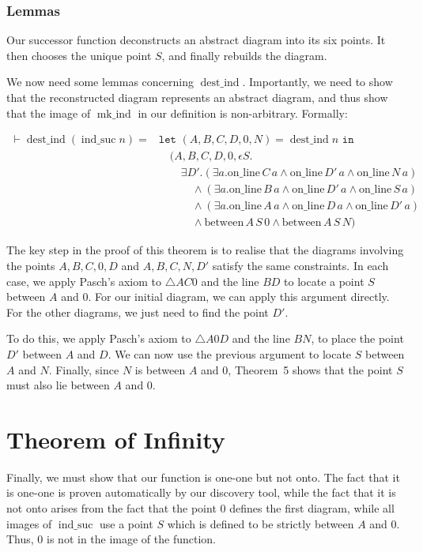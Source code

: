 \documentclass{article}
\DeclareMathOperator{\destind}{dest\_ind}
\DeclareMathOperator{\mkind}{mk\_ind}
\DeclareMathOperator{\indsuc}{ind\_suc}
\newcommand{\online}[2]{\text{on\_line}\,#1\,#2}
\newcommand{\between}[3]{\text{between}\,#1\,#2\,#3}
\begin{document}
\subsubsection{Lemmas}
Our successor function deconstructs an abstract diagram into its six points. It then chooses the unique point $S$, and finally rebuilds the diagram. 

We now need some lemmas concerning $\destind$. Importantly, we need to show that the reconstructed diagram represents an abstract diagram, and thus show that the image of $\mkind$ in our definition is non-arbitrary. Formally:

\begin{align*}
\vdash \destind (\indsuc n) = & \texttt{let } (A,B,C,D,0,N) = \destind n \texttt{ in}\\
&\quad (A,B,C,D,0,\epsilon S.\\
&\quad\quad \exists D'. (\exists a. \online{C}{a} \wedge \online{D'}{a} \wedge \online{N}{a})\\
&\qquad\quad \wedge (\exists a. \online{B}{a} \wedge \online{D'}{a} \wedge \online{S}{a})\\
&\qquad\quad \wedge (\exists a. \online{A}{a} \wedge \online{D}{a} \wedge \online{D'}{a})\\
&\qquad\quad \wedge \between{A}{S}{0} \wedge \between{A}{S}{N})
\end{align*} 

The key step in the proof of this theorem is to realise that the diagrams involving the points $A,B,C,0,D$ and $A,B,C,N,D'$ satisfy the same constraints. In each case, we apply Pasch's axiom to $\triangle AC0$ and the line $BD$ to locate a point $S$ between $A$ and $0$. For our initial diagram, we can apply this argument directly. For the other diagrams, we just need to find the point $D'$.

To do this, we apply Pasch's axiom to $\triangle A0D$ and the line $BN$, to place the point $D'$ between $A$ and $D$. We can now use the previous argument to locate $S$ between $A$ and $N$. Finally, since $N$ is between $A$ and $0$, Theorem~5 shows that the point $S$ must also lie between $A$ and $0$. 

\section{Theorem of Infinity}
Finally, we must show that our function is one-one but not onto. The fact that it is one-one is proven automatically by our discovery tool, while the fact that it is not onto arises from the fact that the point $0$ defines the first diagram, while all images of $\indsuc$ use a point $S$ which is defined to be strictly between $A$ and $0$. Thus, $0$ is not in the image of the function.
\end{document}
